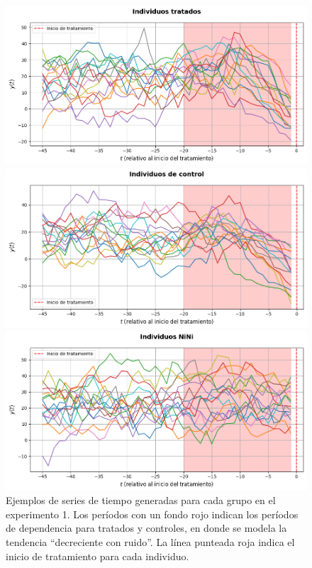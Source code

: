 \documentclass[../../main.tex]{subfiles}
\begin{document}
\begin{figure}[ht]
    \centering
    \begin{minipage}{0.48\textwidth}
        \centering
        \includegraphics[scale=0.3]{figs/Exp1/tratados_sim61.png}
    \end{minipage}
    \hfill
    \begin{minipage}{0.48\textwidth}
        \centering
        \includegraphics[scale=0.3]{figs/Exp1/controles_sim61.png}
    \end{minipage}
    \vspace{0.5em}
    \begin{minipage}{0.6\textwidth}
        \centering
        \includegraphics[scale=0.3]{figs/Exp1/ninis_sim61.png}
    \end{minipage}
    \caption{Ejemplos de series de tiempo generadas para cada grupo en el experimento 1.
    Los períodos con un fondo rojo indican los períodos de dependencia para tratados y
    controles, en donde se modela la tendencia ``decreciente con ruido''. La línea
    punteada roja indica el inicio de tratamiento para cada individuo.}
    \label{fig:time_series_exp1}
\end{figure}
\end{document}
